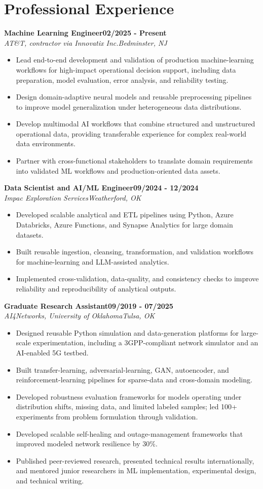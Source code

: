\documentclass[9pt,letterpaper]{extarticle}
\newcommand{\role}[4]{%
  \Needspace{4\baselineskip}\textbf{#1}\hfill\textbf{#2}\\[-1pt]
  \textit{#3}\hfill\textit{#4}\par}
\begin{document}
\section{Professional Experience}
\role{Machine Learning Engineer}{02/2025 - Present}{AT\&T, contractor via Innovatix Inc.}{Bedminster, NJ}
\begin{itemize}
\item Lead end-to-end development and validation of production machine-learning workflows for high-impact operational decision support, including data preparation, model evaluation, error analysis, and reliability testing.
\item Design domain-adaptive neural models and reusable preprocessing pipelines to improve model generalization under heterogeneous data distributions.
\item Develop multimodal AI workflows that combine structured and unstructured operational data, providing transferable experience for complex real-world data environments.
\item Partner with cross-functional stakeholders to translate domain requirements into validated ML workflows and production-oriented data assets.
\end{itemize}
\role{Data Scientist and AI/ML Engineer}{09/2024 - 12/2024}{Impac Exploration Services}{Weatherford, OK}
\begin{itemize}
\item Developed scalable analytical and ETL pipelines using Python, Azure Databricks, Azure Functions, and Synapse Analytics for large domain datasets.
\item Built reusable ingestion, cleansing, transformation, and validation workflows for machine-learning and LLM-assisted analytics.
\item Implemented cross-validation, data-quality, and consistency checks to improve reliability and reproducibility of analytical outputs.
\end{itemize}
\role{Graduate Research Assistant}{09/2019 - 07/2025}{AI4Networks, University of Oklahoma}{Tulsa, OK}
\begin{itemize}
\item Designed reusable Python simulation and data-generation platforms for large-scale experimentation, including a 3GPP-compliant network simulator and an AI-enabled 5G testbed.
\item Built transfer-learning, adversarial-learning, GAN, autoencoder, and reinforcement-learning pipelines for sparse-data and cross-domain modeling.
\item Developed robustness evaluation frameworks for models operating under distribution shifts, missing data, and limited labeled samples; led 100+ experiments from problem formulation through validation.
\item Developed scalable self-healing and outage-management frameworks that improved modeled network resilience by 30\%.
\item Published peer-reviewed research, presented technical results internationally, and mentored junior researchers in ML implementation, experimental design, and technical writing.
\end{itemize}
\end{document}
